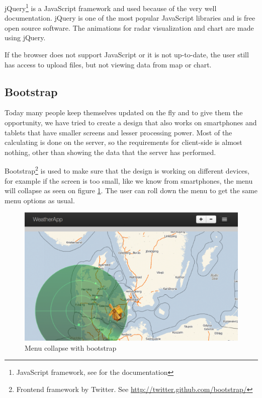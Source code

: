 jQuery\footnote{JavaScript framework, see \cite{jquery} for the documentation} is a JavaScript framework and used because of the very well documentation. jQuery is one of the most popular JavaScript libraries and is free open source software. The animations for radar visualization and chart are made using jQuery.

If the browser does not support JavaScript or it is not up-to-date, the user still has access to upload files, but not viewing data from map or chart.

\subsection{Bootstrap}
\label{sec:bootstrap}
Today many people keep themselves updated on the fly and to give them the opportunity, we have tried to create a design that also works on smartphones and tablets that have smaller screens and lesser processing power. Most of the calculating is done on the server, so the requirements for client-side is almost nothing, other than showing the data that the server has performed.

Bootstrap\footnote{Frontend framework by Twitter. See \url{http://twitter.github.com/bootstrap/}} is used to make sure that the design is working on different devices, for example if the screen is too small, like we know from smartphones, the menu will collapse as seen on figure \ref{fig:bootstrap}. The user can roll down the menu to get the same menu options as usual.

\begin{figure}[htbp]
\centering
   \includegraphics[width=.95\linewidth]{figure/bootstrap.eps}
   \caption{Menu collapse with bootstrap}
   \label{fig:bootstrap}
\end{figure}

